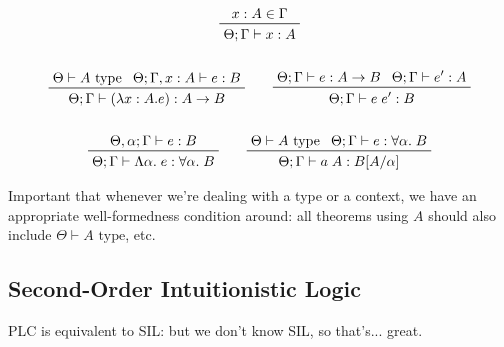 \documentclass[11pt]{article}
\begin{document}
{{        \begin{gather*}
        \prftree[r]{}
        {x:A \in \Gamma}
        {\Theta;\Gamma\vdash x:A}
        \\
        \\
        \prftree[r]{}
        {\Theta\vdash A\text{ type}}
        {\Theta;\Gamma,x:A\vdash e : B}
        {\Theta;\Gamma\vdash (\lambda x:A.e) : A \rightarrow B}
        \qquad
        \prftree[r]{}
        {\Theta;\Gamma\vdash e : A \rightarrow B}
        {\Theta;\Gamma\vdash e' : A}
        {\Theta;\Gamma\vdash e\;e' : B}
        \\
        \\
        \prftree[r]{}
        {\Theta,\alpha;\Gamma\vdash e : B}
        {\Theta;\Gamma\vdash \Lambda\alpha.\;e : \forall\alpha.\;B}
        \qquad
        \prftree[r]{}
        {\Theta\vdash A\text{ type}}
        {\Theta;\Gamma\vdash e : \forall\alpha.\;B}
        {\Theta;\Gamma\vdash a\;A : B[A/\alpha]}
        \end{gather*}

        Important that whenever we're dealing with a type or a context, we have an appropriate well-formedness condition
        around: all theorems using \(A\) should also include \(\Theta\vdash A\text{ type}\), etc.

        \subsection*{Second-Order Intuitionistic Logic}
        {
            PLC is equivalent to SIL: but we don't know SIL, so that's... great.
        }
    }
}
\end{document}
